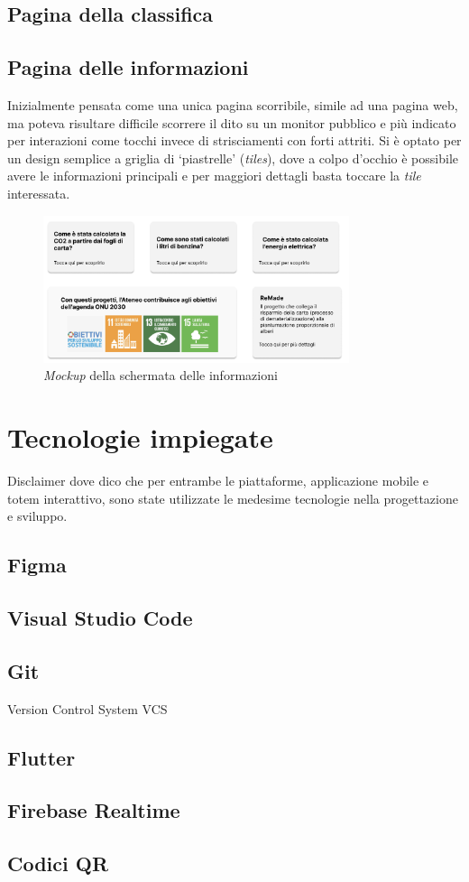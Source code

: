 \subsection{Pagina della classifica}

%
\subsection{Pagina delle informazioni}
Inizialmente pensata come una unica pagina scorribile, simile ad una pagina web, ma poteva risultare difficile scorrere il dito su un monitor pubblico e più indicato per interazioni come tocchi invece di strisciamenti con forti attriti.
Si è optato per un design semplice a griglia di \enquote*{piastrelle} (\textit{tiles}), dove a colpo d'occhio è possibile avere le informazioni principali e per maggiori dettagli basta toccare la \textit{tile} interessata.

\begin{figure} [h]
    \includegraphics[width=0.8\textwidth]{img/infoPage.png}
    \caption{\textit{Mockup} della schermata delle informazioni}
    \label{fig:infoPage}
\end{figure}

%
%
%
\section{Tecnologie impiegate}
Disclaimer dove dico che per entrambe le piattaforme, applicazione mobile e totem interattivo, sono state utilizzate le medesime tecnologie nella progettazione e sviluppo.

\subsection{Figma}
%
\subsection{Visual Studio Code}
%
\subsection{Git}
Version Control System VCS
%
\subsection{Flutter}
%
\subsection{Firebase Realtime}
%
\subsection{Codici QR}
%
